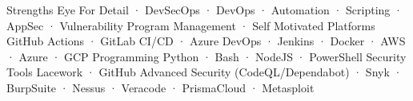 


\begin{cvaboutme}
    \cvabout
        {Strengths}
        {Eye For Detail · DevSecOps · DevOps · Automation · Scripting · AppSec · Vulnerability Program Management · Self Motivated}
    \cvabout
        {Platforms}
        {GitHub Actions · GitLab CI/CD · Azure DevOps · Jenkins · Docker · AWS · Azure · GCP}
    \cvabout
        {Programming}
        {Python · Bash · NodeJS · PowerShell}
    \cvabout
        {Security Tools}
        {Lacework · GitHub Advanced Security (CodeQL/Dependabot) · Snyk · BurpSuite · Nessus · Veracode · PrismaCloud · Metasploit}
\cvsubsection{}
\end{cvaboutme}